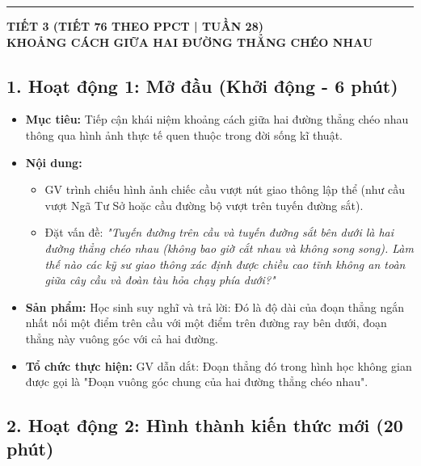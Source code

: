 \documentclass[12pt, a4paper]{article}
\begin{document}
\vspace{10pt}
\hrule
\vspace{10pt}

\begin{center}
    \textbf{\large TIẾT 3 (TIẾT 76 THEO PPCT | TUẦN 28)}\\[4pt]
    \textbf{\large KHOẢNG CÁCH GIỮA HAI ĐƯỜNG THẲNG CHÉO NHAU}
\end{center}

\subsection*{1. Hoạt động 1: Mở đầu (Khởi động - 6 phút)}

\begin{itemize}[leftmargin=1.2cm]
    \item[a)] \textbf{Mục tiêu:} Tiếp cận khái niệm khoảng cách giữa hai đường thẳng chéo nhau thông qua hình ảnh thực tế quen thuộc trong đời sống kĩ thuật.
    \item[b)] \textbf{Nội dung:}
    \begin{itemize}[leftmargin=0.6cm]
        \item GV trình chiếu hình ảnh chiếc cầu vượt nút giao thông lập thể (như cầu vượt Ngã Tư Sở hoặc cầu đường bộ vượt trên tuyến đường sắt).
        \item Đặt vấn đề: \textit{"Tuyến đường trên cầu và tuyến đường sắt bên dưới là hai đường thẳng chéo nhau (không bao giờ cắt nhau và không song song). Làm thế nào các kỹ sư giao thông xác định được chiều cao tĩnh không an toàn giữa cây cầu và đoàn tàu hỏa chạy phía dưới?"}
    \end{itemize}

    \item[c)] \textbf{Sản phẩm:} Học sinh suy nghĩ và trả lời: Đó là độ dài của đoạn thẳng ngắn nhất nối một điểm trên cầu với một điểm trên đường ray bên dưới, đoạn thẳng này vuông góc với cả hai đường.
    \item[d)] \textbf{Tổ chức thực hiện:} GV dẫn dắt: Đoạn thẳng đó trong hình học không gian được gọi là "Đoạn vuông góc chung của hai đường thẳng chéo nhau".
\end{itemize}

\subsection*{2. Hoạt động 2: Hình thành kiến thức mới (20 phút)}
\end{document}
